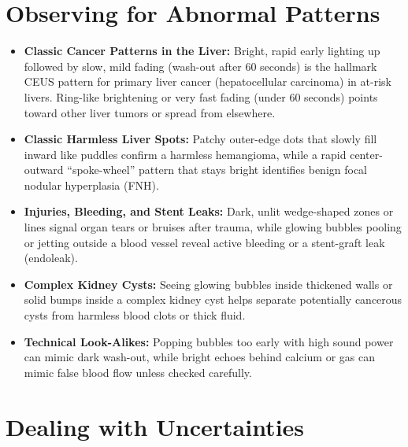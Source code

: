 \section{Observing for Abnormal Patterns}

\begin{itemize}
    \item \textbf{Classic Cancer Patterns in the Liver:} Bright, rapid early lighting up followed by slow, mild fading (wash-out after 60 seconds) is the hallmark CEUS pattern for primary liver cancer (hepatocellular carcinoma) in at-risk livers. Ring-like brightening or very fast fading (under 60 seconds) points toward other liver tumors or spread from elsewhere.
    \item \textbf{Classic Harmless Liver Spots:} Patchy outer-edge dots that slowly fill inward like puddles confirm a harmless hemangioma, while a rapid center-outward ``spoke-wheel'' pattern that stays bright identifies benign focal nodular hyperplasia (FNH).
    \item \textbf{Injuries, Bleeding, and Stent Leaks:} Dark, unlit wedge-shaped zones or lines signal organ tears or bruises after trauma, while glowing bubbles pooling or jetting outside a blood vessel reveal active bleeding or a stent-graft leak (endoleak).
    \item \textbf{Complex Kidney Cysts:} Seeing glowing bubbles inside thickened walls or solid bumps inside a complex kidney cyst helps separate potentially cancerous cysts from harmless blood clots or thick fluid.
    \item \textbf{Technical Look-Alikes:} Popping bubbles too early with high sound power can mimic dark wash-out, while bright echoes behind calcium or gas can mimic false blood flow unless checked carefully.
\end{itemize}

\section{Dealing with Uncertainties}

